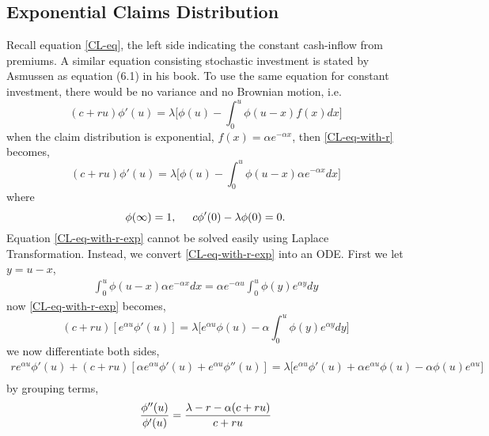 \documentclass[12pt]{article}
\begin{document}
\subsection{Exponential Claims Distribution}

Recall equation \eqref{CL-eq}, the left side indicating the constant cash-inflow from premiums. A similar equation consisting stochastic investment is stated by Asmussen as equation (6.1) in his book\cite{ref01}. To use the same equation for constant investment, there would be no variance and no Brownian motion, i.e. 
\begin{equation}\label{CL-eq-with-r}
    (c+ru)\phi'(u)=\lambda\Big[\phi(u)-\int_{0}^{u}\phi(u-x)f(x)dx\Big]
\end{equation}
when the claim distribution is exponential, $f(x)=\alpha e^{-\alpha x}$, then \eqref{CL-eq-with-r} becomes,
\begin{equation}\label{CL-eq-with-r-exp}
    (c+ru)\phi'(u)=\lambda\Big[\phi(u)-\int_{0}^{u}\phi(u-x)\alpha e^{-\alpha x}dx\Big]
\end{equation}
where
\begin{equation}\label{exp_inv_IC}
    \phi(\infty)=1,
    \hspace{0.5cm}
    c\phi'(0)-\lambda\phi(0)=0.
\end{equation}
Equation \eqref{CL-eq-with-r-exp} cannot be solved easily using Laplace Transformation. Instead, we convert \eqref{CL-eq-with-r-exp} into an ODE. First we let $y=u-x$, \\
\begin{align*}
    \int_{0}^{u}\phi(u-x)\alpha e^{-\alpha x}dx= \alpha e^{-\alpha u} \int_{0}^{u}\phi(y)e^{\alpha y}dy
\end{align*}
now \eqref{CL-eq-with-r-exp} becomes,
\begin{equation}\label{exp_inv_integro_differential}
    (c+ru)[e^{\alpha u}\phi'(u)]=\lambda\Big[e^{\alpha u}\phi(u)-\alpha\int_{0}^{u}\phi(y)e^{\alpha y}dy\Big]
\end{equation}
we now differentiate both sides,
\begin{align*}
    re^{\alpha u}\phi'(u)+(c+ru)[\alpha e^{\alpha u}\phi'(u)+e^{\alpha u}\phi''(u)]=\lambda\Big[e^{\alpha u}\phi'(u)+\alpha e^{\alpha u}\phi(u)-\alpha\phi(u)e^{\alpha u}\Big]\\
\end{align*}
by grouping terms,
\begin{equation}
    \frac{\phi''(u)}{\phi'(u)}=\frac{\lambda-r-\alpha(c+ru)}{c+ru}\\
\end{equation}
\end{document}
